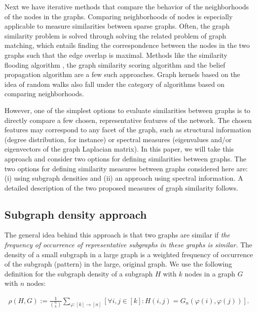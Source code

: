 % 
Next we have iterative methods that compare the behavior of the
neighborhoods of the nodes in the graphs.
% 
Comparing neighborhoods of nodes is especially applicable to measure
similarities between sparse graphs.
% 
Often, the graph similarity problem is solved through solving the
related problem of graph matching, which entails finding the
correspondence between the nodes in the two graphs such that the edge
overlap is maximal.
% 
Methods like the similarity flooding algorithm
\cite{Meln02similarity}, the graph similarity scoring algorithm
\cite{Zage08graph} and the belief propagation algorithm
\cite{Bay09message} are a few such approaches.
% 
Graph kernels based on the idea of random walks
\cite{Gaert03graph,Kash03marginalized,Mahe04extensions} also fall
under the category of algorithms based on comparing neighborhoods.

% 
However, one of the simplest options to evaluate similarities between
graphs is to directly compare a few chosen, representative features of
the network.
% 
The chosen features may correspond to any facet of the graph, such as
structural information (degree distribution, for instance) or spectral
measures (eigenvalues and/or eigenvectors of the graph Laplacian
matrix).
% 
In this paper, we will take this approach and consider two options for
defining similarities between graphs.
% 
The two options for defining similarity measures between graphs
considered here are: (i) using subgraph densities and (ii) an approach
using spectral information.
% 
A detailed description of the two proposed measures of graph
similarity follows.

\subsection{\label{ss:den} Subgraph density approach}

The general idea behind this approach is that two graphs are similar
if {\em the frequency of occurrence of representative subgraphs in
  these graphs is similar.}
% 
The density of a small subgraph in a large graph is a weighted
frequency of occurrence of the subgraph (pattern) in the large,
original graph.
% 
We use the following definition for the subgraph density of a subgraph
$H$ with $k$ nodes in a graph $G$ with $n$ nodes:

\begin{align}
  \label{eqn:homdenG}
  \rho(H,G) := \frac{1}{{n\choose k}} \!  \sum_{\varphi:[k] \to [n]} \!
  \left[ \forall  i, j \in [k] \! : \! H(i,j) \! = \! G_n(\varphi(i),
  \varphi(j)) \right].
\end{align}

